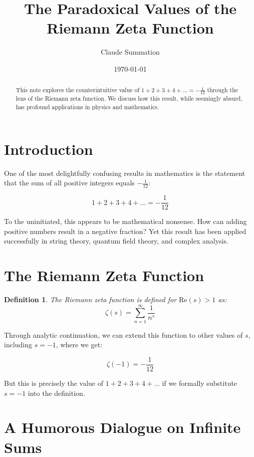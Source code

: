 \documentclass{article}
\title{The Paradoxical Values of the Riemann Zeta Function}
\author{Claude Summation}
\date{\today}
\newtheorem{definition}{Definition}
\begin{document}
\maketitle

\begin{abstract}
    This note explores the counterintuitive value of $1+2+3+4+\ldots = -\frac{1}{12}$ through the lens of the Riemann zeta function. We discuss how this result, while seemingly absurd, has profound applications in physics and mathematics.
\end{abstract}

\section{Introduction}

One of the most delightfully confusing results in mathematics is the statement that the sum of all positive integers equals $-\frac{1}{12}$:

$$1 + 2 + 3 + 4 + \ldots = -\frac{1}{12}$$

To the uninitiated, this appears to be mathematical nonsense. How can adding positive numbers result in a negative fraction? Yet this result has been applied successfully in string theory, quantum field theory, and complex analysis.

\section{The Riemann Zeta Function}

\begin{definition}
    The Riemann zeta function is defined for $\text{Re}(s) > 1$ as:
    $$\zeta(s) = \sum_{n=1}^{\infty} \frac{1}{n^s}$$
\end{definition}

Through analytic continuation, we can extend this function to other values of $s$, including $s = -1$, where we get:

$$\zeta(-1) = -\frac{1}{12}$$

But this is precisely the value of $1 + 2 + 3 + 4 + \ldots$ if we formally substitute $s = -1$ into the definition.

\section{A Humorous Dialogue on Infinite Sums}
\end{document}
